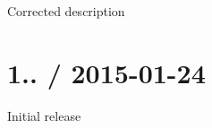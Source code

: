 
\begin{DoxyItemize}
\item Corrected description
\end{DoxyItemize}

\section*{1.. / 2015-\/01-\/24 }


\begin{DoxyItemize}
\item Initial release 
\end{DoxyItemize}